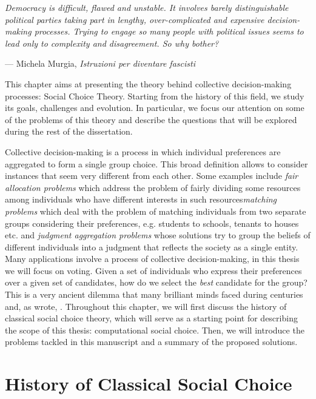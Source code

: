 \setlength{}
\setlength\epigraphrule{0pt}
\renewcommand{\textflush}{flushepinormal}
\epigraph{\itshape Democracy is difficult, flawed and unstable. It involves barely distinguishable political parties taking part in lengthy, over-complicated and expensive decision-making processes. Trying to engage so many people with political issues seems to lead only to complexity and disagreement. So why bother?}{--- Michela Murgia, \textit{Istruzioni per diventare fascisti}}

This chapter aims at presenting the theory behind collective decision-making processes: Social Choice Theory. Starting from the history of this field, we study its goals, challenges and evolution. In particular, we focus our attention on some of the problems of this theory and describe the questions that will be explored during the rest of the dissertation.

Collective decision-making is a process in which individual preferences are aggregated to form a single group choice. This broad definition allows to consider instances that seem very different from each other. Some examples include \textit{fair allocation problems} \textemdash which address the problem of fairly dividing some resources among individuals who have different interests in such resources\textemdash \textit{matching problems} \textemdash which deal with the problem of matching individuals from two separate groups considering their preferences, e.g. students to schools, tenants to houses etc. \textemdash and \textit{judgment aggregation problems} \textemdash whose solutions try to group the beliefs of different individuals into a judgment that reflects the society as a single entity. Many applications involve a process of collective decision-making, in this thesis we will focus on voting. Given a set of individuals who express their preferences over a given set of candidates, how do we select the \textit{best} candidate for the group? This is a very ancient dilemma that many brilliant minds faced during centuries and, as \citet{McLean1990} wrote, . Throughout this chapter, we will first discuss the history of classical social choice theory, which will serve as a starting point for describing the scope of this thesis: computational social choice. Then, we will introduce the problems tackled in this manuscript and a summary of the proposed solutions.

\section{History of Classical Social Choice}

